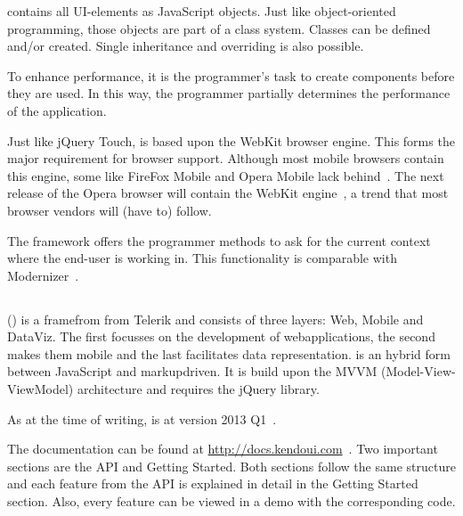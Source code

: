 \documentclass[a4paper]{artikel3}
\renewcommand{\url}[1]{\href{#1}{#1}}
\newcommand{\setspace}[0]{\vspace{2mm}}
\renewcommand{\paragraph}[1]{\setspace \noindent {\bf #1}  }
\begin{document}
\sta{} contains all UI-elements as JavaScript objects.  
Just like object-oriented programming,  those objects are part of a class system.  
Classes can be defined and/or created.  
Single inheritance and overriding is also possible.    

To enhance performance,  it is the programmer's task to create components before they are used.  
In this way,  the programmer partially determines the performance of the application.

\paragraph{Browser support}
Just like jQuery Touch,  \sta{} is based upon the WebKit browser engine.  
This forms the major requirement for browser support.  
Although most mobile browsers contain this engine,  some like FireFox Mobile and Opera Mobile lack behind~\cite{JohnEClark2012}.  
The next release of the Opera browser will contain the WebKit engine~\cite{Wokke2013}, a trend that most browser vendors will (have to) follow.

The framework offers the programmer methods to ask for the current context where the end-user is working in.
This functionality is comparable with Modernizer~\cite{Modernizr2012}.  


\subsection{\kendo} %
\label{sec:frameworks-kendo}

\kendo{} (\kendob{}) is a framefrom from Telerik and consists of three layers:  \kendo{} Web,  \kendo{} Mobile and \kendo{} DataViz.
The first focusses on the development of webapplications,  the second makes them mobile and the last facilitates data representation.
\kendo{} is an hybrid form between JavaScript and markupdriven.
It is build upon the MVVM (Model-View-ViewModel) architecture and requires the jQuery library.

As at the time of writing,  \kendo{} is at version 2013 Q1~\cite{Telerik}. 

\paragraph{Documentation}
The documentation can be found at \url{http://docs.kendoui.com}~\cite{Telerikd}.
Two important sections are the API and Getting Started.
Both sections follow the same structure and each feature from the API is explained in detail in the Getting Started section.
Also,  every feature can be viewed in a demo with the corresponding code.
\end{document}
